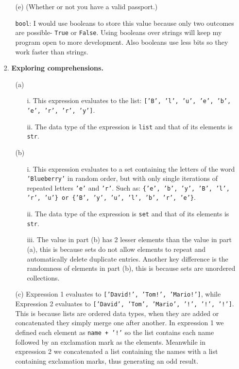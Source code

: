 \documentclass[12pt]{article}
\begin{document}
\begin{enumerate}
\begin{enumerate}
\item[(e)] (Whether or not you have a valid passport.)

\texttt{bool}: I would use booleans to store this value because only two outcomes are possible- \texttt{True} or \texttt{False}. Using booleans over strings will keep my program open to more development. Also booleans use less bits so they work faster than strings.
\end{enumerate}


\item[2.] \textbf{Exploring comprehensions.}

\begin{enumerate}
\item[(a)]
\begin{enumerate}
    \item[i.] This expression evaluates to the list: \texttt{['B', 'l', 'u', 'e', 'b', 'e', 'r', 'r', 'y']}.
    \item[ii.] The data type of the expression is \texttt{list} and that of its elements is \texttt{str}.
\end{enumerate}
\item[(b)]
\begin{enumerate}
    \item[i.] This expression evaluates to a set containing the letters of the word \texttt{'Blueberry'} in random order, but with only single iterations of repeated letters \texttt{'e'} and \texttt{'r'}. Such as: \texttt{\{'e', 'b', 'y', 'B', 'l', 'r', 'u'\} or \{'B', 'y', 'u', 'l', 'b', 'r', 'e'\}}.
    \item[ii.] The data type of the expression is \texttt{set} and that of its elements is \texttt{str}.
    \item[iii.] The value in part (b) has 2 lesser elements than the value in part (a), this is because sets do not allow elements to repeat and automatically delete duplicate entries. Another key difference is the randomness of elements in part (b), this is because sets are unordered collections.
\end{enumerate}
\item[(c)]
Expression 1 evaluates to \texttt{['David!', 'Tom!', 'Mario!']}, while Expression 2 evaluates to \texttt{['David', 'Tom', 'Mario', '!', '!', '!']}. This is because lists are ordered data types, when they are added or concatenated they simply merge one after another. In expression 1 we defined each element as \texttt{name + '!'} so the list contains each name followed by an exclamation mark as the elements. Meanwhile in expression 2 we concatenated a list containing the names with a list containing exclamation marks, thus generating an odd result.
\end{enumerate}
\end{enumerate}
\end{document}
